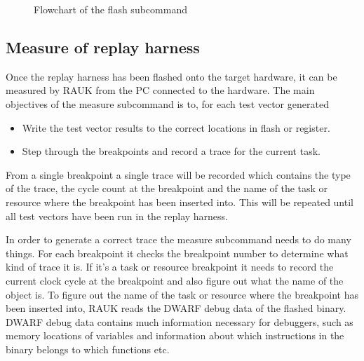\begin{figure}[H]
    \centering
    \caption{Flowchart of the flash subcommand}
    \label{fig:flashcmd}
\end{figure}

\subsection{Measure of replay harness}
Once the replay harness has been flashed onto the target hardware, it can
be measured by RAUK from the PC connected to the hardware. The main objectives
of the measure subcommand is to, for each test vector generated
\begin{itemize}
   \item Write the test vector results to the correct locations in flash or register.
   \item Step through the breakpoints and record a trace for the current task.
\end{itemize}
From a single breakpoint a single trace will be recorded which contains the
type of the trace, the cycle count at the breakpoint and the name of the task
or resource where the breakpoint has been inserted into.  This will be repeated
until all test vectors have been run in the replay harness.

In order to generate a correct trace the measure subcommand needs to do many
things. For each breakpoint it checks the breakpoint number to determine what
kind of trace it is. If it's a task or resource breakpoint it needs to record
the current clock cycle at the breakpoint and also figure out what the name
of the object is. To figure out the name of the task or resource where the
breakpoint has been inserted into, RAUK reads the DWARF\cite{dwarfspec} debug
data of the flashed binary. DWARF debug data contains much information
necessary for debuggers, such as memory locations of variables and information
about which instructions in the binary belongs to which functions etc.

